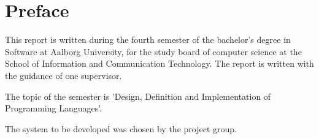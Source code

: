 %
%
%
\chapter*{Preface}
This report is written during the fourth semester of the bachelor's degree in Software at Aalborg University, for the study board of computer science at the School of Information and Communication Technology.
The report is written with the guidance of one supervisor.

The topic of the semester is 'Design, Definition and Implementation of Programming Languages'.

The system to be developed was chosen by the project group.



\newpage